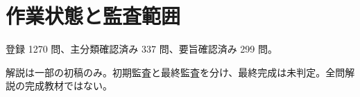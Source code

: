 \chapter{作業状態と監査範囲}
登録 1270 問、主分類確認済み 337 問、要旨確認済み 299 問。
\par 解説は一部の初稿のみ。初期監査と最終監査を分け、最終完成は未判定。全問解説の完成教材ではない。
